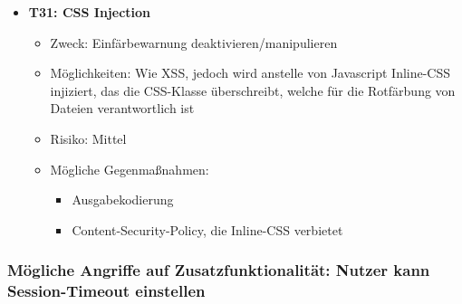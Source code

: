 \documentclass[12pt,DIV14,BCOR10mm,a4paper,parskip=half-,headsepline,headinclude,english,ngerman,bibliography=totocnumbered]{scrreprt}
\begin{document}
\begin{itemize}

  \hypertarget{threat31}{}
  \item \textbf{T31: CSS Injection}
  \begin{itemize}
  \item Zweck: Einfärbewarnung deaktivieren/manipulieren
  \item Möglichkeiten: Wie XSS, jedoch wird anstelle von Javascript Inline-CSS injiziert, das die CSS-Klasse überschreibt, welche für die Rotfärbung von Dateien verantwortlich ist
  \item Risiko: Mittel
  \item Mögliche Gegenmaßnahmen:
  \begin{itemize}
	  \item Ausgabekodierung
	  \item Content-Security-Policy, die Inline-CSS verbietet
  \end{itemize}
\end{itemize}
\end{itemize}

\subsubsection{Mögliche Angriffe auf Zusatzfunktionalität: Nutzer kann Session-Timeout einstellen}
\end{document}
